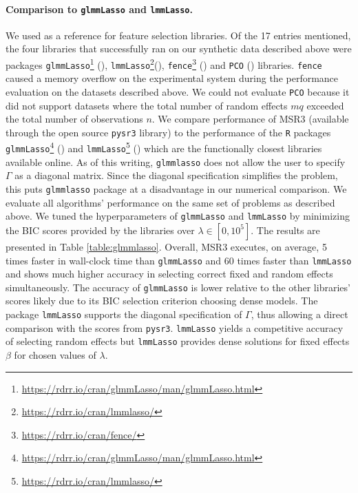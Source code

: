 \paragraph{Comparison to \texttt{glmmLasso} and \texttt{lmmLasso}.}
We used \cite[Table 3]{Buscemi2019Survey} as a reference 
for feature selection libraries. Of the 17 entries mentioned, the four libraries that successfully ran on our synthetic data described above were  packages \texttt{glmmLasso}\footnote{\href{https://rdrr.io/cran/glmmLasso/man/glmmLasso.html}{https://rdrr.io/cran/glmmLasso/man/glmmLasso.html}} (\cite{groll2014variable}), \texttt{lmmLasso}\footnote{\href{https://rdrr.io/cran/lmmlasso/}{https://rdrr.io/cran/lmmlasso/}}(\cite{schelldorfer2011estimation}), \texttt{fence}\footnote{\href{https://rdrr.io/cran/fence/}{https://rdrr.io/cran/fence/}} (\cite{jiang2008fence}) and \texttt{PCO} (\cite{lin2013pco}) libraries. \texttt{fence} caused a memory overflow on the experimental system during the performance evaluation on the datasets described above. We could not evaluate {\texttt{PCO} because
it did not support  datasets where the total number of random effects $mq$ exceeded the total number of observations $n$. We compare performance of MSR3 
(available through the open source \texttt{pysr3} library) 
to the performance of the \texttt{R} packages \texttt{glmmLasso}\footnote{\href{https://rdrr.io/cran/glmmLasso/man/glmmLasso.html}{https://rdrr.io/cran/glmmLasso/man/glmmLasso.html}} (\cite{groll2014variable}) and \texttt{lmmLasso}\footnote{\href{https://rdrr.io/cran/lmmlasso/}{https://rdrr.io/cran/lmmlasso/}} (\cite{schelldorfer2011estimation}) which are the functionally closest libraries available
} online. As of this writing, \texttt{glmmlasso} does not allow the user to specify $\Gamma$ as a diagonal matrix.  Since the diagonal specification simplifies the problem, this puts \texttt{glmmlasso} package at a disadvantage in our numerical comparison. We evaluate all algorithms' performance on the same set of problems as described above. We tuned the hyperparameters of \texttt{glmmLasso} and \texttt{lmmLasso} by minimizing the BIC scores provided by the libraries over $\lambda \in [0, 10^5]$. The results are presented in Table \ref{table:glmmlasso}. Overall, MSR3 executes, on average, 5 times faster in wall-clock time than \texttt{glmmLasso} and 60 times faster than \texttt{lmmLasso} and shows much higher accuracy in selecting correct fixed and random effects simultaneously. 
{The accuracy of \texttt{glmmLasso} is lower relative to the other libraries' scores likely due to its BIC selection criterion choosing dense models.} The package \texttt{lmmLasso} supports the diagonal specification of $\Gamma$, thus allowing a direct comparison with the scores from \texttt{pysr3}.  \texttt{lmmLasso} yields a competitive accuracy of selecting random effects but \texttt{lmmLasso} provides dense solutions for fixed effects $\beta$ for chosen values of $\lambda$. 

